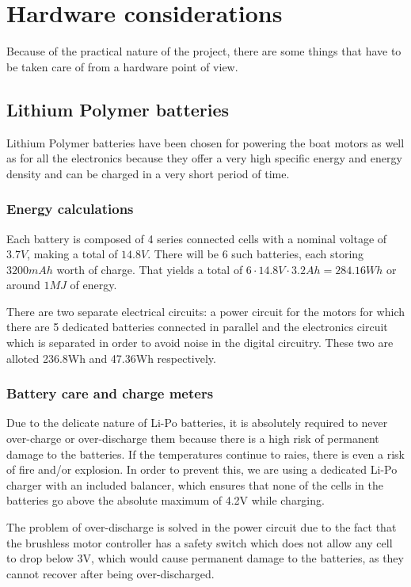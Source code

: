 \chapter{Hardware considerations}

Because of the practical nature of the project, there are some things that have to be taken care of from a hardware point of view.

\section{Lithium Polymer batteries}

Lithium Polymer batteries have been chosen for powering the boat motors as well as for all the electronics because they offer a very high specific energy and energy density and can be charged in a very short period of time. 

\subsection{Energy calculations}

Each battery is composed of 4 series connected cells with a nominal voltage of $ 3.7V $, making a total of $ 14.8V $. There will be 6 such batteries, each storing $ 3200mAh $ worth of charge. That yields a total of $ 6 \cdot 14.8V \cdot 3.2Ah = 284.16Wh $ or around $ 1MJ $ of energy.

There are two separate electrical circuits: a power circuit for the motors for which there are 5 dedicated batteries connected in parallel and the electronics circuit which is separated in order to avoid noise in the digital circuitry. These two are alloted 236.8Wh and 47.36Wh respectively.

\subsection{Battery care and charge meters}

Due to the delicate nature of Li-Po batteries, it is absolutely required to never over-charge or over-discharge them because there is a high risk of permanent damage to the batteries. If the temperatures continue to raies, there is even a risk of fire and/or explosion. In order to prevent this, we are using a dedicated Li-Po charger with an included balancer, which ensures that none of the cells in the batteries go above the absolute maximum of 4.2V while charging.

The problem of over-discharge is solved in the power circuit due to the fact that the brushless motor controller has a safety switch which does not allow any cell to drop below 3V, which would cause permanent damage to the batteries, as they cannot recover after being over-discharged. 

